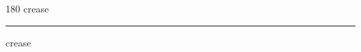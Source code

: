 
\begin{frame}
\begin{center}
\begin{turn}{180}
{\fontsize{2.5cm}{1em}\selectfont crease}
\end{turn}
\vspace{1em}\par  
\hrule
\vspace{1em}\par  
{\fontsize{2.5cm}{1em}\selectfont crease}
\end{center}
\end{frame}
